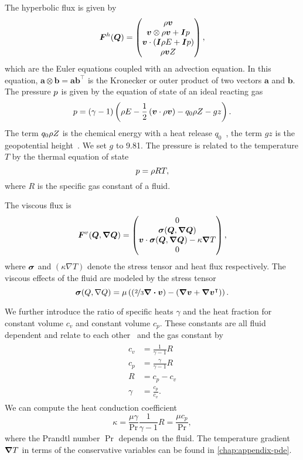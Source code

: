 The hyperbolic flux is given by
\begin{equation}
  \label{eq:hyper-flux}
  \bm{F}^{h}(\bm{Q}) = \begin{pmatrix} \rho \bm{v} \\ \bm{v} \otimes \rho \bm{v} + \bm{I} p \\ \bm{v} \cdot (\bm{I} \rho E + \bm{I} p) \\ \rho \bm{v} Z \end{pmatrix},
\end{equation}
which are the Euler equations coupled with an advection equation.
In this equation, $\bm{a} \otimes \bm{b} = \bm{a} \bm{b}^\intercal$ is the Kronecker or outer product of two vectors $\bm{a}$ and $\bm{b}$.
The pressure $p$ is given by the equation of state of an ideal reacting gas
\begin{equation}
  \label{eq:eos}
  p = (\gamma - 1) \left(\rho E - \frac{1}{2} \left(\bm{v} \cdot \rho \bm{v} \right)  - q_0 \rho Z - gz \right).
\end{equation}
The term $q_0 \rho Z$ is the chemical energy with a heat release $q_0$~\cite{helzel2000modified}, the term $gz$ is the geopotential height~\cite{giraldo2008study}.
We set $g$ to 9.81.
The pressure is related to the temperature $T$ by the thermal equation of state
\begin{equation}
  \label{eq:temperature}
  p = \rho R T,
\end{equation}
where $R$ is the specific gas constant of a fluid.

The viscous flux is
\begin{equation}
  \label{eq:visc-flux}
  \viscFlux(\Q, \gradQ) = \viscFluxDef,
\end{equation}
where $\bm{\sigma}$ and $(\kappa \nabla T)$ denote the stress tensor and heat flux respectively.
The viscous effects of the fluid are modeled by the stress tensor
\begin{equation}
  \label{eq:stress-tensor}
  \stressT(Q, \nabla Q) =
  \mu
  \left(
  \left(\nicefrac{2}{3} \divergence{\Qv} \right) -
  \left( \gradient{\Qv} + \gradient{\Qv}^\intercal \right)
  \right).
\end{equation}

We further introduce the ratio of specific heats $\gamma$ and the heat fraction for constant volume $c_v$ and constant volume $c_p$.
These constants are all fluid dependent and relate to each other~\cite{dumbser2010arbitrary} and the gas constant by
\begin{align}
  \label{eq:fluid-constants}
  \begin{split}
  c_v &= \frac{1}{\gamma - 1} R \\
  c_p &= \frac{\gamma}{\gamma - 1} R\\
  R &= c_p - c_v\\
  \gamma &= \frac{c_p}{c_v}.
  \end{split}
\end{align}
We can compute the heat conduction coefficient
\begin{equation}
  \label{eq:heat-conduction-coeff}
  \kappa = \frac{\mu \gamma}{\Pr} \frac{1}{\gamma - 1} R = \frac{\mu c_p}{\Pr},
\end{equation}
where the Prandtl number $\Pr$ depends on the fluid.
The temperature gradient $\gradient{T}$ in terms of the conservative variables can be found in \cref{chap:appendix-pde}.

